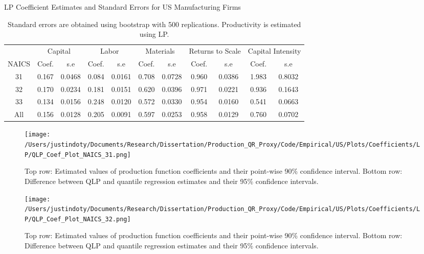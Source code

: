 \documentclass[11pt]{article}
\begin{document}
\begin{table}[H]
\centering
\caption{LP Coefficient Estimates and Standard Errors for US Manufacturing Firms}
\begin{tabular}{ccccccccccc}
  \hline\hline & \multicolumn{2}{c}{Capital} & \multicolumn{2}{c}{Labor} & \multicolumn{2}{c}{Materials} & \multicolumn{2}{c}{Returns to Scale} & \multicolumn{2}{c}{Capital Intensity}\\ \cmidrule(lr){2-3} \cmidrule(lr){4-5} \cmidrule(lr){6-7} \cmidrule(lr){8-9} \cmidrule(lr){10-11}NAICS & Coef. & s.e & Coef. & s.e & Coef. & s.e & Coef. & s.e & Coef. & s.e \\ 
  \hline
31 & 0.167 & 0.0468 & 0.084 & 0.0161 & 0.708 & 0.0728 & 0.960 & 0.0386 & 1.983 & 0.8032 \\ 
  32 & 0.170 & 0.0234 & 0.181 & 0.0151 & 0.620 & 0.0396 & 0.971 & 0.0221 & 0.936 & 0.1643 \\ 
  33 & 0.134 & 0.0156 & 0.248 & 0.0120 & 0.572 & 0.0330 & 0.954 & 0.0160 & 0.541 & 0.0663 \\ 
  All & 0.156 & 0.0128 & 0.205 & 0.0091 & 0.597 & 0.0253 & 0.958 & 0.0129 & 0.760 & 0.0702 \\ 
   \hline
\end{tabular}
\caption*{\footnotesize Standard errors are obtained using bootstrap with 500 replications. Productivity is estimated using LP.}
\end{table}

\begin{figure}[H]
\centering
\texttt{[image: /Users/justindoty/Documents/Research/Dissertation/Production\_QR\_Proxy/Code/Empirical/US/Plots/Coefficients/LP/QLP\_Coef\_Plot\_NAICS\_31.png]}
\caption{Top row: Estimated values of production function coefficients and their point-wise 90\% confidence interval. Bottom row: Difference between QLP and quantile regression estimates and their 95\% confidence intervals.}
\label{fig:31coef}
\end{figure}

\begin{figure}[H]
\centering
\texttt{[image: /Users/justindoty/Documents/Research/Dissertation/Production\_QR\_Proxy/Code/Empirical/US/Plots/Coefficients/LP/QLP\_Coef\_Plot\_NAICS\_32.png]}
\caption{Top row: Estimated values of production function coefficients and their point-wise 90\% confidence interval. Bottom row: Difference between QLP and quantile regression estimates and their 95\% confidence intervals.}
\label{fig:32coef}
\end{figure}
\end{document}
